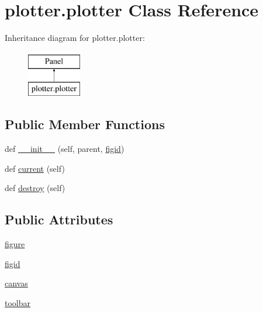 \hypertarget{classplotter_1_1plotter}{}\section{plotter.\+plotter Class Reference}
\label{classplotter_1_1plotter}
Inheritance diagram for plotter.\+plotter\+:\begin{figure}[H]
\begin{center}
\leavevmode
\includegraphics[height=2.000000cm]{classplotter_1_1plotter}
\end{center}
\end{figure}
\subsection*{Public Member Functions}
\begin{DoxyCompactItemize}
\item 
def \hyperlink{classplotter_1_1plotter_aa8c4aa595a3765f6f83ce75c1e9989ea}{\+\_\+\+\_\+init\+\_\+\+\_\+} (self, parent, \hyperlink{classplotter_1_1plotter_a9f4c4616f4fd21c3c9ae6dd320bfbeb6}{figid})
\item 
def \hyperlink{classplotter_1_1plotter_a4c7ba64058a8be7d362958e469429ed6}{current} (self)
\item 
def \hyperlink{classplotter_1_1plotter_a6bdaaad7796180c8dbe453ea192d982e}{destroy} (self)
\end{DoxyCompactItemize}
\subsection*{Public Attributes}
\begin{DoxyCompactItemize}
\item 
\hyperlink{classplotter_1_1plotter_a8766011b81271bcd938237fc9253af45}{figure}
\item 
\hyperlink{classplotter_1_1plotter_a9f4c4616f4fd21c3c9ae6dd320bfbeb6}{figid}
\item 
\hyperlink{classplotter_1_1plotter_a4e223147b19d30bad6a7a0177f3fe08d}{canvas}
\item 
\hyperlink{classplotter_1_1plotter_a55f4eaa8635020a1f0d76241dcfee593}{toolbar}
\end{DoxyCompactItemize}


